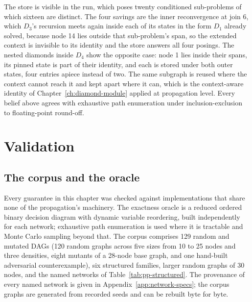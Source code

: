 \documentclass[12pt]{report}
\begin{document}
The store is visible in the run, which poses twenty conditioned sub-problems of which sixteen are distinct. The four savings are the inner reconvergence at join 6, which $D_3$'s recursion meets again inside each of its states in the form $D_1$ already solved, because node 14 lies outside that sub-problem's span, so the extended context is invisible to its identity and the store answers all four posings. The nested diamonds inside $D_4$ show the opposite case: node 1 lies inside their spans, its pinned state is part of their identity, and each is stored under both outer states, four entries apiece instead of two. The same subgraph is reused where the context cannot reach it and kept apart where it can, which is the context-aware identity of Chapter~\ref{ch:diamond-module} applied at propagation level. Every belief above agrees with exhaustive path enumeration under inclusion-exclusion to floating-point round-off.

\section{Validation}
\label{sec:pp-validation}

\subsection{The corpus and the oracle}
\label{sec:pp-corpus}

Every guarantee in this chapter was checked against implementations that share none of the
propagation's machinery. The exactness oracle is a reduced ordered binary decision diagram
with dynamic variable reordering, built independently for each network; exhaustive path
enumeration is used where it is tractable and Monte Carlo sampling beyond that. The corpus
comprises 129 random and mutated DAGs (120 random graphs across five sizes from 10 to 25
nodes and three densities, eight mutants of a 28-node base graph, and one hand-built
adversarial counterexample), six structured families, larger random graphs of 30 nodes, and
the named networks of Table~\ref{tab:pp-structured}. The provenance of every named network
is given in Appendix~\ref{app:network-specs}; the corpus graphs are generated from recorded
seeds and can be rebuilt byte for byte.
\end{document}
